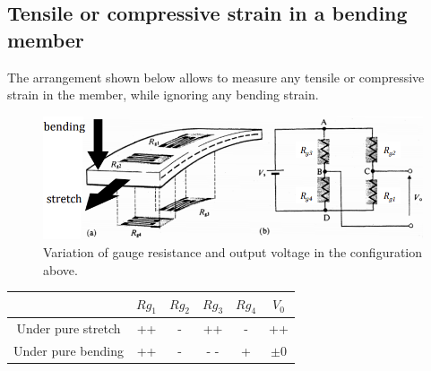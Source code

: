 \documentclass[class=report, crop=false, 12pt,a4paper, tikz, border=4mm]{standalone}
\begin{document}
\subsection{Tensile or compressive strain in a bending member}
The arrangement shown below allows to measure any tensile or compressive strain in the member, while ignoring any bending strain.
\begin{figure}[H]
  \centering
  \includegraphics[width = 0.8 \textwidth]{../img/diagram17.png}
  \caption{Variation of gauge resistance and output voltage in the configuration above.}
\end{figure} 
\begin{center}
  \begin{tabular}{||c | c c c c c||} 
    \hline
    & $Rg_1$ & $Rg_2$ & $Rg_3$ & $Rg_4$ & $V_0$\\
    \hline
    Under pure stretch & ++ & - & ++ & - & ++\\
    Under pure bending & ++ & - & - - & + & $\pm 0$ \\
    \hline 
 \end{tabular}
\end{center}
\end{document}
